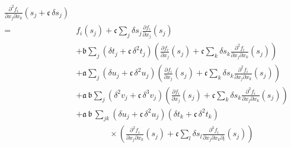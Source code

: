 \begin{align*}
\frac{ \partial^{2} f_{i} }{ \partial x_{j} \partial x_{k} } \! \left( s_{j} + \mathfrak{c} \, \delta s_{j} \right)
\\
%
=&
f_{i} \! \left( s_{j} \right) + \mathfrak{c} \sum_{j} \delta s_{j} 
\frac{ \partial f_{i} }{ \partial x_{j} } \! \left( s_{j} \right)
\\
&+ 
\mathfrak{b}
\sum_{j} \left( \delta t_{j} + \mathfrak{c} \, \delta^{2} t_{j} \right) 
\left( \frac{ \partial f_{i} }{ \partial x_{j} } \! \left( s_{j} \right) 
+  \mathfrak{c} \sum_{k} \delta s_{k} 
\frac{ \partial^{2} f_{i} }{ \partial x_{j} \partial x_{k} } \! \left( s_{j} \right) \right)
\\
&+ 
\mathfrak{a} \sum_{j}
\left( \delta u_{j} + \mathfrak{c} \, \delta^{2} u_{j} \right) 
\left( \frac{ \partial f_{i} }{ \partial x_{j} } \! \left( s_{j} \right) 
+ \mathfrak{c} \sum_{k} \delta s_{k} 
\frac{ \partial^{2} f_{i} }{ \partial x_{j} \partial x_{k} } \! \left( s_{j} \right) \right)
\\
& + \mathfrak{a} \, \mathfrak{b} \sum_{j}
\left( \delta^{2} v_{j} + \mathfrak{c} \, \delta^{3} v_{j} \right) 
\left( \frac{ \partial f_{i} }{ \partial x_{j} } \! \left( s_{j} \right) 
+ \mathfrak{c} \sum_{k} \delta s_{k} 
\frac{ \partial^{2} f_{i} }{ \partial x_{j} \partial x_{k} } \! \left( s_{j} \right) \right)
\\
&+ 
\mathfrak{a} \, \mathfrak{b} \, \sum_{jk} 
\left( \delta u_{j} + \mathfrak{c} \, \delta^{2} u_{j} \right) 
\left( \delta t_{k} + \mathfrak{c} \, \delta^{2} t_{k} \right)
\\
& \quad\quad\quad\quad \times \left(
\frac{ \partial^{2} f_{i} }{ \partial x_{j} \partial x_{k} } \! \left( s_{j} \right) 
+ \mathfrak{c} \sum_{l} \delta s_{l} 
\frac{ \partial^{3} f_{i} }{ \partial x_{j} \partial x_{k} \partial_{l} } \! \left( s_{j} \right)
\right)
\\
%
\end{align*}

